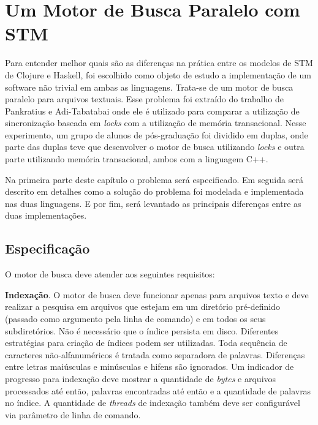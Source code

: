 \chapter{Um Motor de Busca Paralelo com STM}

\newcommand{\bigO}[1]{\ensuremath{\operatorname{O}\bigl(#1\bigr)}}

Para entender melhor quais são as diferenças na prática entre os modelos de STM de Clojure e Haskell, foi escolhido como objeto de estudo a implementação de um software não trivial em ambas as linguagens. Trata-se de um motor de busca paralelo para arquivos textuais. Esse problema foi extraído do trabalho de Pankratius e Adi-Tabatabai \cite{pankratius2011study} onde ele é utilizado para comparar a utilização de sincronização baseada em \emph{locks} com a utilização de memória transacional. Nesse experimento, um grupo de alunos de pós-graduação foi dividido em duplas, onde parte das duplas teve que desenvolver o motor de busca utilizando \emph{locks} e outra parte utilizando memória transacional, ambos com a linguagem C++.

Na primeira parte deste capítulo o problema será especificado. Em seguida será descrito em detalhes como a solução do problema foi modelada e implementada nas duas linguagens. E por fim, será levantado as principais diferenças entre as duas implementações.

\section{Especificação}

O motor de busca deve atender aos seguintes requisitos: \cite{pankratius2011study}

\textbf{Indexação}. O motor de busca deve funcionar apenas para arquivos texto e deve realizar a pesquisa em arquivos que estejam em um diretório pré-definido (passado como argumento pela linha de comando) e em todos os seus subdiretórios. Não é necessário que o índice persista em disco. Diferentes estratégias para criação de índices podem ser utilizadas. Toda sequência de caracteres não-alfanuméricos é tratada como separadora de palavras. Diferenças entre letras maiúsculas e minúsculas e hifens são ignorados. Um indicador de progresso para indexação deve mostrar a quantidade de \emph{bytes} e arquivos processados até então, palavras encontradas até então e a quantidade de palavras no índice. A quantidade de \emph{threads} de indexação também deve ser configurável via parâmetro de linha de comando.

